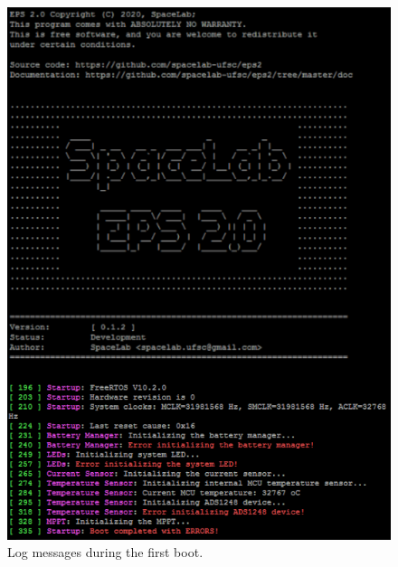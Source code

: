 \begin{figure}[!ht]
    \begin{center}
        \includegraphics[width=0.7\columnwidth]{figures/v01/log-first-boot.png}
        \caption{Log messages during the first boot.}
        \label{fig:log-first-boot}
    \end{center}
\end{figure}

